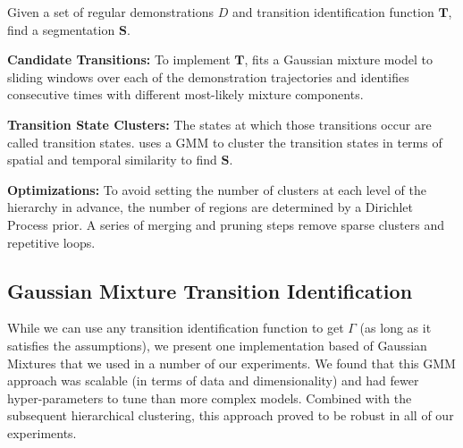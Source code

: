 \begin{problem}
Given a set of regular demonstrations $D$ and transition identification function $\mathbf{T}$, find a segmentation $\mathbf{S}$.
\end{problem}

\noindent \textbf{Candidate Transitions: } To implement $\mathbf{T}$, \tsc fits a Gaussian mixture model to sliding windows over each of the demonstration trajectories and identifies consecutive times with different most-likely mixture components.

\vspace{0.25em}

\noindent \textbf{Transition State Clusters: } The states at which those transitions occur are called transition states.
\tsc uses a GMM to cluster the transition states in terms of spatial and temporal similarity to find $\mathbf{S}$.

\vspace{0.25em}

\noindent \textbf{Optimizations: } To avoid setting the number of clusters at each level of the hierarchy in advance, the number of regions are determined by a Dirichlet Process prior.
A series of merging and pruning steps remove sparse clusters and repetitive loops.

\subsection*{Gaussian Mixture Transition Identification}
While we can use any transition identification function to get $\Gamma$ (as long as it satisfies the assumptions), we present one implementation based of Gaussian Mixtures that we used in a number of our experiments.
We found that this GMM approach was scalable (in terms of data and dimensionality) and had fewer hyper-parameters to tune than more complex models.
Combined with the subsequent hierarchical clustering, this approach proved to be robust in all of our experiments.

